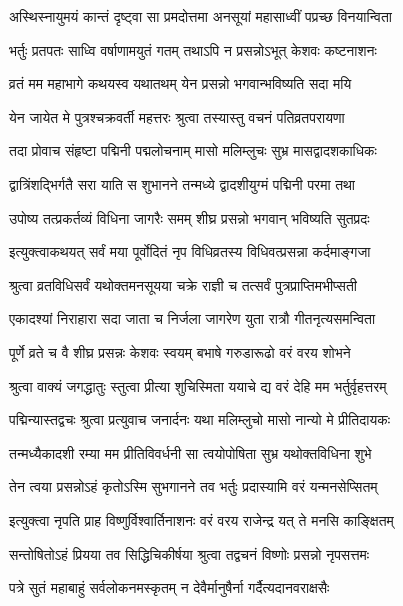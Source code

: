 \twolineshloka
{अस्थिस्नायुमयं कान्तं दृष्ट्वा सा प्रमदोत्तमा}
{अनसूयां महासाध्वीं पप्रच्छ विनयान्विता} %

\twolineshloka
{भर्तुः प्रतपतः साध्वि वर्षाणामयुतं गतम्}
{तथाऽपि न प्रसन्नोऽभूत् केशवः कष्टनाशनः} %

\twolineshloka
{व्रतं मम महाभागे कथयस्व यथातथम्}
{येन प्रसन्नो भगवान्भविष्यति सदा मयि} %

\twolineshloka
{येन जायेत मे पुत्रश्चक्रवर्ती महत्तरः}
{श्रुत्वा तस्यास्तु वचनं पतिव्रतपरायणा} %

\twolineshloka
{तदा प्रोवाच संहृष्टा पद्मिनी पद्मलोचनाम्}
{मासो मलिम्लुचः सुभ्र मासद्वादशकाधिकः} %

\twolineshloka
{द्वात्रिंशद्भिर्गतै सरा याति स शुभानने}
{तन्मध्ये द्वादशीयुग्मं पद्मिनी परमा तथा} %

\twolineshloka
{उपोष्य तत्प्रकर्तव्यं विधिना जागरैः समम्}
{शीघ्र प्रसन्नो भगवान् भविष्यति सुतप्रदः} %

\twolineshloka
{इत्युक्त्वाकथयत् सर्वं मया पूर्वोदितं नृप}
{विधिव्रतस्य विधिवत्प्रसन्ना कर्दमाङ्गजा} %

\twolineshloka
{श्रुत्वा व्रतविधिसर्वं यथोक्तमनसूयया}
{चक्रे राज्ञी च तत्सर्वं पुत्रप्राप्तिमभीप्सती} %

\twolineshloka
{एकादश्यां निराहारा सदा जाता च निर्जला}
{जागरेण युता रात्रौ गीतनृत्यसमन्विता} %

\twolineshloka
{पूर्णे व्रते च वै शीघ्र प्रसन्नः केशवः स्वयम्}
{बभाषे गरुडारूढो वरं वरय शोभने} %

\twolineshloka
{श्रुत्वा वाक्यं जगद्धातुः स्तुत्वा प्रीत्या शुचिस्मिता}
{ययाचे द्य वरं देहि मम भर्तुर्वृहत्तरम्} %

\twolineshloka
{पद्मिन्यास्तद्वचः श्रुत्वा प्रत्युवाच जनार्दनः}
{यथा मलिम्लुचो मासो नान्यो मे प्रीतिदायकः} %

\twolineshloka
{तन्मध्यैकादशी रम्या मम प्रीतिविवर्धनी}
{सा त्वयोपोषिता सुभ्र यथोक्तविधिना शुभे} %

\twolineshloka
{तेन त्वया प्रसन्नोऽहं कृतोऽस्मि सुभगानने}
{तव भर्तुः प्रदास्यामि वरं यन्मनसेप्सितम्} %

\twolineshloka
{इत्युक्त्वा नृपति प्राह विष्णुर्विश्वार्तिनाशनः}
{वरं वरय राजेन्द्र यत् ते मनसि काङ्क्षितम्} %

\twolineshloka
{सन्तोषितोऽहं प्रियया तव सिद्धिचिकीर्षया}
{श्रुत्वा तद्वचनं विष्णोः प्रसन्नो नृपसत्तमः} %

\twolineshloka
{पत्रे सुतं महाबाहुं सर्वलोकनमस्कृतम्}
{न देवैर्मानुषैर्ना गर्दैत्यदानवराक्षसैः} %

